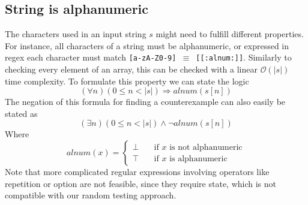 \documentclass{article}
\begin{document}
\subsection{String is alphanumeric}\label{subsec:alnum}
The characters used in an input string $s$ might need to fulfill different properties. For instance, all characters of a string must be alphanumeric, or expressed in regex each character must match \texttt{[a-zA-Z0-9] $\equiv$ [[:alnum:]]}. Similarly to checking every element of an array, this can be checked with a linear $\mathcal{O}(|s|)$ time complexity. To formulate this property we can state the logic
\begin{equation}\label{eq:alnum-unversial}
  (\forall n) (0 \le n < |s|) \Rightarrow alnum(s[n])
\end{equation}
The negation of this formula for finding a counterexample can also easily be stated as
\begin{equation}\label{eq:alnum-existential}
  (\exists n) (0 \le n < |s|) \land \neg alnum(s[n])
\end{equation}
Where
\begin{equation*}
    alnum(x) =
    \begin{cases}
    \bot & \quad \text{if } x \text{ is not alphanumeric}\\
    \top & \quad \text{if } x \text{ is alphanumeric}
  \end{cases}
\end{equation*}
Note that more complicated regular expressions involving operators like repetition or option are not feasible, since they require state, which is not compatible with our random testing approach.

\end{document}
